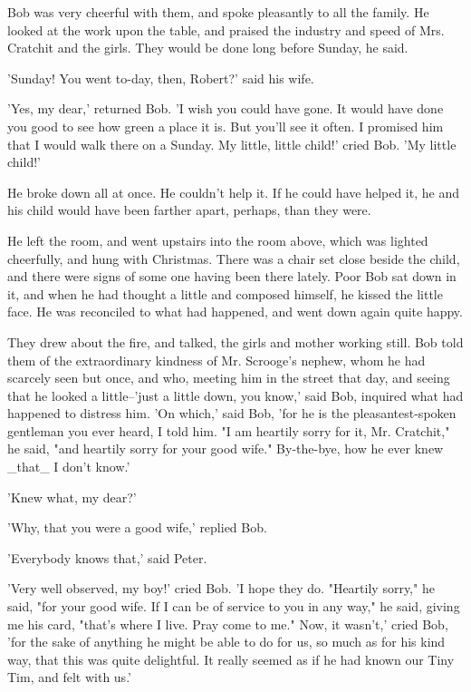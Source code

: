 Bob was very cheerful with them, and spoke pleasantly to all the family.
He looked at the work upon the table, and praised the industry and speed
of Mrs. Cratchit and the girls. They would be done long before Sunday,
he said.

'Sunday! You went to-day, then, Robert?' said his wife.

'Yes, my dear,' returned Bob. 'I wish you could have gone. It would have
done you good to see how green a place it is. But you'll see it often. I
promised him that I would walk there on a Sunday. My little, little
child!' cried Bob. 'My little child!'

He broke down all at once. He couldn't help it. If he could have helped
it, he and his child would have been farther apart, perhaps, than they
were.

He left the room, and went upstairs into the room above, which was
lighted cheerfully, and hung with Christmas. There was a chair set close
beside the child, and there were signs of some one having been there
lately. Poor Bob sat down in it, and when he had thought a little and
composed himself, he kissed the little face. He was reconciled to what
had happened, and went down again quite happy.

They drew about the fire, and talked, the girls and mother working
still. Bob told them of the extraordinary kindness of Mr. Scrooge's
nephew, whom he had scarcely seen but once, and who, meeting him in the
street that day, and seeing that he looked a little--'just a little
down, you know,' said Bob, inquired what had happened to distress him.
'On which,' said Bob, 'for he is the pleasantest-spoken gentleman you
ever heard, I told him. "I am heartily sorry for it, Mr. Cratchit," he
said, "and heartily sorry for your good wife." By-the-bye, how he ever
knew _that_ I don't know.'

'Knew what, my dear?'

'Why, that you were a good wife,' replied Bob.

'Everybody knows that,' said Peter.

'Very well observed, my boy!' cried Bob. 'I hope they do. "Heartily
sorry," he said, "for your good wife. If I can be of service to you in
any way," he said, giving me his card, "that's where I live. Pray come
to me." Now, it wasn't,' cried Bob, 'for the sake of anything he might
be able to do for us, so much as for his kind way, that this was quite
delightful. It really seemed as if he had known our Tiny Tim, and felt
with us.'

